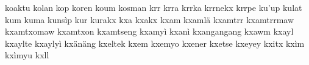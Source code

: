 \documentclass[a4paper]{article}
\begin{document}
koaktu\hspace{2mm}
kolan\hspace{2mm}
kop\hspace{2mm}
koren\hspace{2mm}
koum\hspace{2mm}
kosman\hspace{2mm}
krr\hspace{2mm}
krra\hspace{2mm}
krrka\hspace{2mm}
krrnekx\hspace{2mm}
krrpe\hspace{2mm}
ku'up\hspace{2mm}
kulat\hspace{2mm}
kum\hspace{2mm}
kuma\hspace{2mm}
kunsìp\hspace{2mm}
kur\hspace{2mm}
kurakx\hspace{2mm}
kxa\hspace{2mm}
kxakx\hspace{2mm}
kxam\hspace{2mm}
kxamlä\hspace{2mm}
kxamtrr\hspace{2mm}
kxamtrrmaw\hspace{2mm}
kxamtxomaw\hspace{2mm}
kxamtxon\hspace{2mm}
kxamtseng\hspace{2mm}
kxamyì\hspace{2mm}
kxanì\hspace{2mm}
kxangangang\hspace{2mm}
kxawm\hspace{2mm}
kxayl\hspace{2mm}
kxaylte\hspace{2mm}
kxaylyì\hspace{2mm}
kxänäng\hspace{2mm}
kxeltek\hspace{2mm}
kxem\hspace{2mm}
kxemyo\hspace{2mm}
kxener\hspace{2mm}
kxetse\hspace{2mm}
kxeyey\hspace{2mm}
kxitx\hspace{2mm}
kxìm\hspace{2mm}
kxìmyu\hspace{2mm}
kxll\hspace{2mm}
\end{document}

